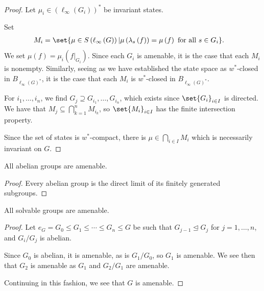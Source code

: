 \documentclass[10pt]{mypackage2}
\begin{document}
\begin{proof}
  Let $\mu_i\in \left(\ell_{\infty}\left(G_i\right)\right)^{\ast}$ be invariant states.\newline

  Set
  \begin{align*}
    M_i &= \set{\mu\in S\left(\ell_{\infty}\left(G\right)\right)| \mu\left(\lambda_s\left(f\right)\right) = \mu\left(f\right)\text{ for all }s\in G_i}.
  \end{align*}
  We set $\mu\left(f\right) = \mu_i\left(f|_{G_i}\right)$. Since each $G_i$ is amenable, it is the case that each $M_i$ is nonempty. Similarly, seeing as we have established the state space as $w^{\ast}$-closed in $B_{\ell_{\infty}\left(G\right)^{\ast}}$, it is the case that each $M_i$ is $w^{\ast}$-closed in $B_{\ell_{\infty}\left(G\right)^{\ast}}$.\newline

  For $i_1,\dots,i_n$, we find $G_j \supseteq G_{i_1},\dots,G_{i_n}$, which exists since $\set{G_i}_{i\in I}$ is directed. We have that $M_j\subseteq \bigcap_{k=1}^{n}M_{i_k}$, so $\set{M_i}_{i\in I}$ has the finite intersection property.\newline

  Since the set of states is $w^{\ast}$-compact, there is $\mu\in \bigcap_{i\in I}M_i$ which is necessarily invariant on $G$.
\end{proof}
\begin{corollary}\label{cor:abelian_groups_amenable}
  All abelian groups are amenable.
\end{corollary}
\begin{proof}
  Every abelian group is the direct limit of its finitely generated subgroups.
\end{proof}
\begin{corollary}\label{cor:solvable_groups_amenable}
  All solvable groups are amenable.
\end{corollary}
\begin{proof}
  Let $e_G = G_0 \leq G_1\leq\cdots\leq G_n\leq G$ be such that $G_{j-1}\trianglelefteq G_j$ for $j=1,\dots,n$, and $G_i/G_j$ is abelian.\newline

  Since $G_0$ is abelian, it is amenable, as is $G_1/G_0$, so $G_1$ is amenable. We see then that $G_2$ is amenable as $G_1$ and $G_2/G_1$ are amenable.\newline

  Continuing in this fashion, we see that $G$ is amenable.
\end{proof}
\end{document}
